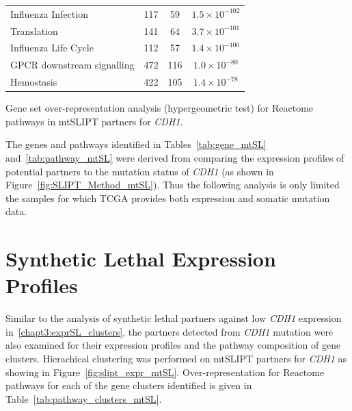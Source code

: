 \begin{table}[!ht]
{\begin{threeparttable}
\begin{tabular}{lccc}
  \rowcolor{black!5}
  Influenza Infection & 117 &  59 & $1.5 \times 10^{-102}$ \\ 
  \rowcolor{black!10}
  Translation & 141 &  64 & $3.7 \times 10^{-101}$ \\ 
  \rowcolor{black!5}
  Influenza Life Cycle & 112 &  57 & $1.4 \times 10^{-100}$ \\ 
  \rowcolor{black!10}
  GPCR downstream signalling & 472 & 116 & $1.0 \times 10^{-80}$ \\ 
  \rowcolor{black!5}
  Hemostasis & 422 & 105 & $1.4 \times 10^{-78}$ \\ 
  \hline
\end{tabular}
\begin{tablenotes}
\raggedright \small
Gene set over-representation analysis (hypergeometric test) for Reactome pathways in \acrshort{mtSLIPT} partners for \textit{CDH1}.
\end{tablenotes}
\end{threeparttable}
}
\end{table}

\FloatBarrier

The genes and pathways identified in Tables~\ref{tab:gene_mtSL} and~\ref{tab:pathway_mtSL} were derived from comparing the expression profiles of potential partners to the mutation status of \textit{CDH1} (as shown in Figure~\ref{fig:SLIPT_Method_mtSL}). Thus the following analysis is only limited the samples for which \gls{TCGA} provides both expression and somatic mutation data.

\FloatBarrier

\section{Synthetic Lethal Expression Profiles} \label{appendix:mtSL_clusters}

Similar to the analysis of synthetic lethal partners against low \textit{CDH1} expression in~\ref{chapt3:exprSL_clusters}, the partners detected from \textit{CDH1} mutation were also examined for their expression profiles and the pathway composition of gene clusters. Hierachical clustering was performed on \acrshort{mtSLIPT} partners for \textit{CDH1} as showing in Figure~\ref{fig:slipt_expr_mtSL}. Over-representation for Reactome pathways for each of the gene clusters identified is given in Table~\ref{tab:pathway_clusters_mtSL}.

